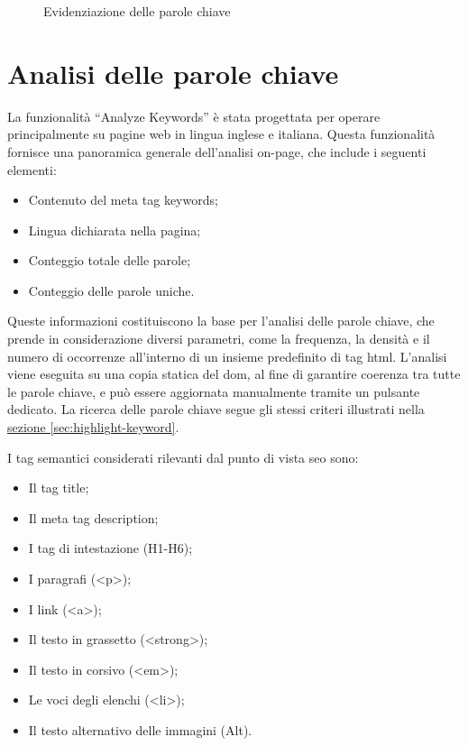 \begin{figure}[H]
  \centering 
  \caption{Evidenziazione delle parole chiave}
  \label{fig:highlight_keyword}
\end{figure}

\section{Analisi delle parole chiave}
\label{sec:analyze-keyword}

La funzionalità “Analyze Keywords” è stata progettata per operare principalmente su pagine web in lingua inglese e italiana. Questa funzionalità fornisce una panoramica generale dell'analisi \gls{on-page}, che include i seguenti elementi:
\begin{itemize}
  \item Contenuto del meta tag keywords;
  \item Lingua dichiarata nella pagina;
  \item Conteggio totale delle parole;
  \item Conteggio delle parole uniche.
\end{itemize}

\vspace{5pt}
\noindent Queste informazioni costituiscono la base per l'analisi delle parole chiave, che prende in considerazione diversi parametri, come la frequenza, la densità e il numero di occorrenze all’interno di un insieme predefinito di tag \gls{html}. L'analisi viene eseguita su una copia statica del \gls{dom}, al fine di garantire coerenza tra tutte le parole chiave, e può essere aggiornata manualmente tramite un pulsante dedicato. La ricerca delle parole chiave segue gli stessi criteri illustrati nella \hyperref[sec:highlight-keyword]{sezione \textsection\ref*{sec:highlight-keyword}}.

\vspace{10pt}
\noindent I tag semantici considerati rilevanti dal punto di vista \gls{seo} sono:
\begin{itemize}
  \item Il tag title;
  \item Il meta tag description;
  \item I tag di intestazione (H1-H6);
  \item I paragrafi (<p>);
  \item I link (<a>);
  \item Il testo in grassetto (<strong>);
  \item Il testo in corsivo (<em>);
  \item Le voci degli elenchi (<li>);
  \item Il testo alternativo delle immagini (Alt).
\end{itemize}

